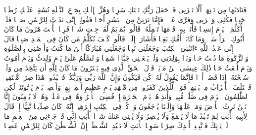 \stopbuffer%
\startbuffer[\q:19:24]
فَنَادَىٰهَا مِن تَحۡتِهَاۤ أَلَّا تَحۡزَنِی قَدۡ جَعَلَ رَبُّكِ تَحۡتَكِ سَرِیࣰّا%
\stopbuffer%
\startbuffer[\q:19:25]
وَهُزِّیۤ إِلَیۡكِ بِجِذۡعِ ٱلنَّخۡلَةِ تُسَٰقِطۡ عَلَیۡكِ رُطَبࣰا جَنِیࣰّا%
\stopbuffer%
\startbuffer[\q:19:26]
فَكُلِی وَٱشۡرَبِی وَقَرِّی عَیۡنࣰاۖ فَإِمَّا تَرَیِنَّ مِنَ ٱلۡبَشَرِ أَحَدࣰا فَقُولِیۤ إِنِّی نَذَرۡتُ لِلرَّحۡمَٰنِ صَوۡمࣰا فَلَنۡ أُكَلِّمَ ٱلۡیَوۡمَ إِنسِیࣰّا%
\stopbuffer%
\startbuffer[\q:19:27]
فَأَتَتۡ بِهِۦ قَوۡمَهَا تَحۡمِلُهُۥۖ قَالُوا۟ یَٰمَرۡیَمُ لَقَدۡ جِئۡتِ شَیۡءࣰا فَرِیࣰّا%
\stopbuffer%
\startbuffer[\q:19:28]
یَٰۤأُخۡتَ هَٰرُونَ مَا كَانَ أَبُوكِ ٱمۡرَأَ سَوۡءࣲ وَمَا كَانَتۡ أُمُّكِ بَغِیࣰّا%
\stopbuffer%
\startbuffer[\q:19:29]
فَأَشَارَتۡ إِلَیۡهِۖ قَالُوا۟ كَیۡفَ نُكَلِّمُ مَن كَانَ فِی ٱلۡمَهۡدِ صَبِیࣰّا%
\stopbuffer%
\startbuffer[\q:19:30]
قَالَ إِنِّی عَبۡدُ ٱللَّهِ ءَاتَىٰنِیَ ٱلۡكِتَٰبَ وَجَعَلَنِی نَبِیࣰّا%
\stopbuffer%
\startbuffer[\q:19:31]
وَجَعَلَنِی مُبَارَكًا أَیۡنَ مَا كُنتُ وَأَوۡصَٰنِی بِٱلصَّلَوٰةِ وَٱلزَّكَوٰةِ مَا دُمۡتُ حَیࣰّا%
\stopbuffer%
\startbuffer[\q:19:32]
وَبَرَّۢا بِوَٰلِدَتِی وَلَمۡ یَجۡعَلۡنِی جَبَّارࣰا شَقِیࣰّا%
\stopbuffer%
\startbuffer[\q:19:33]
وَٱلسَّلَٰمُ عَلَیَّ یَوۡمَ وُلِدتُّ وَیَوۡمَ أَمُوتُ وَیَوۡمَ أُبۡعَثُ حَیࣰّا%
\stopbuffer%
\startbuffer[\q:19:34]
ذَٰلِكَ عِیسَى ٱبۡنُ مَرۡیَمَۖ قَوۡلَ ٱلۡحَقِّ ٱلَّذِی فِیهِ یَمۡتَرُونَ%
\stopbuffer%
\startbuffer[\q:19:35]
مَا كَانَ لِلَّهِ أَن یَتَّخِذَ مِن وَلَدࣲۖ سُبۡحَٰنَهُۥۤۚ إِذَا قَضَىٰۤ أَمۡرࣰا فَإِنَّمَا یَقُولُ لَهُۥ كُن فَیَكُونُ%
\stopbuffer%
\startbuffer[\q:19:36]
وَإِنَّ ٱللَّهَ رَبِّی وَرَبُّكُمۡ فَٱعۡبُدُوهُۚ هَٰذَا صِرَٰطࣱ مُّسۡتَقِیمࣱ%
\stopbuffer%
\startbuffer[\q:19:37]
فَٱخۡتَلَفَ ٱلۡأَحۡزَابُ مِنۢ بَیۡنِهِمۡۖ فَوَیۡلࣱ لِّلَّذِینَ كَفَرُوا۟ مِن مَّشۡهَدِ یَوۡمٍ عَظِیمٍ%
\stopbuffer%
\startbuffer[\q:19:38]
أَسۡمِعۡ بِهِمۡ وَأَبۡصِرۡ یَوۡمَ یَأۡتُونَنَاۖ لَٰكِنِ ٱلظَّٰلِمُونَ ٱلۡیَوۡمَ فِی ضَلَٰلࣲ مُّبِینࣲ%
\stopbuffer%
\startbuffer[\q:19:39]
وَأَنذِرۡهُمۡ یَوۡمَ ٱلۡحَسۡرَةِ إِذۡ قُضِیَ ٱلۡأَمۡرُ وَهُمۡ فِی غَفۡلَةࣲ وَهُمۡ لَا یُؤۡمِنُونَ%
\stopbuffer%
\startbuffer[\q:19:40]
إِنَّا نَحۡنُ نَرِثُ ٱلۡأَرۡضَ وَمَنۡ عَلَیۡهَا وَإِلَیۡنَا یُرۡجَعُونَ%
\stopbuffer%
\startbuffer[\q:19:41]
وَٱذۡكُرۡ فِی ٱلۡكِتَٰبِ إِبۡرَٰهِیمَۚ إِنَّهُۥ كَانَ صِدِّیقࣰا نَّبِیًّا%
\stopbuffer%
\startbuffer[\q:19:42]
إِذۡ قَالَ لِأَبِیهِ یَٰۤأَبَتِ لِمَ تَعۡبُدُ مَا لَا یَسۡمَعُ وَلَا یُبۡصِرُ وَلَا یُغۡنِی عَنكَ شَیۡءࣰا%
\stopbuffer%
\startbuffer[\q:19:43]
یَٰۤأَبَتِ إِنِّی قَدۡ جَاۤءَنِی مِنَ ٱلۡعِلۡمِ مَا لَمۡ یَأۡتِكَ فَٱتَّبِعۡنِیۤ أَهۡدِكَ صِرَٰطࣰا سَوِیࣰّا%
\stopbuffer%
\startbuffer[\q:19:44]
یَٰۤأَبَتِ لَا تَعۡبُدِ ٱلشَّیۡطَٰنَۖ إِنَّ ٱلشَّیۡطَٰنَ كَانَ لِلرَّحۡمَٰنِ عَصِیࣰّا%
